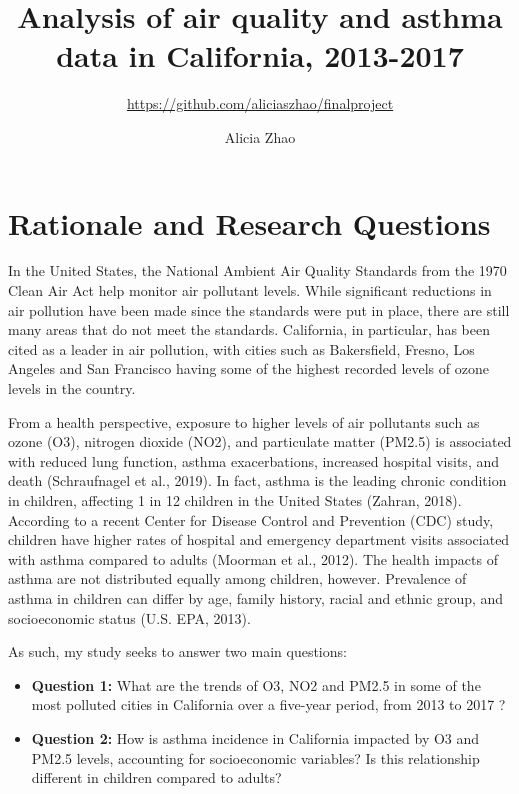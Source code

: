 \documentclass[12pt,]{article}
\title{Analysis of air quality and asthma data in California, 2013-2017}
\subtitle{\url{https://github.com/aliciaszhao/finalproject}}
\author{Alicia Zhao}
\date{}
\begin{document}
\maketitle

\newpage
\tableofcontents 
\newpage
\listoftables 
\newpage
\listoffigures 
\newpage

\hypertarget{rationale-and-research-questions}{%
\section{Rationale and Research
Questions}\label{rationale-and-research-questions}}

In the United States, the National Ambient Air Quality Standards from
the 1970 Clean Air Act help monitor air pollutant levels. While
significant reductions in air pollution have been made since the
standards were put in place, there are still many areas that do not meet
the standards. California, in particular, has been cited as a leader in
air pollution, with cities such as Bakersfield, Fresno, Los Angeles and
San Francisco having some of the highest recorded levels of ozone levels
in the country.

From a health perspective, exposure to higher levels of air pollutants
such as ozone (O3), nitrogen dioxide (NO2), and particulate matter
(PM2.5) is associated with reduced lung function, asthma exacerbations,
increased hospital visits, and death (Schraufnagel et al., 2019). In
fact, asthma is the leading chronic condition in children, affecting 1
in 12 children in the United States (Zahran, 2018). According to a
recent Center for Disease Control and Prevention (CDC) study, children
have higher rates of hospital and emergency department visits associated
with asthma compared to adults (Moorman et al., 2012). The health
impacts of asthma are not distributed equally among children, however.
Prevalence of asthma in children can differ by age, family history,
racial and ethnic group, and socioeconomic status (U.S. EPA, 2013).

As such, my study seeks to answer two main questions:

\begin{itemize}
\item
  \textbf{Question 1:} What are the trends of O3, NO2 and PM2.5 in some
  of the most polluted cities in California over a five-year period,
  from 2013 to 2017 ?
\item
  \textbf{Question 2:} How is asthma incidence in California impacted by
  O3 and PM2.5 levels, accounting for socioeconomic variables? Is this
  relationship different in children compared to adults?
\end{itemize}
\end{document}

